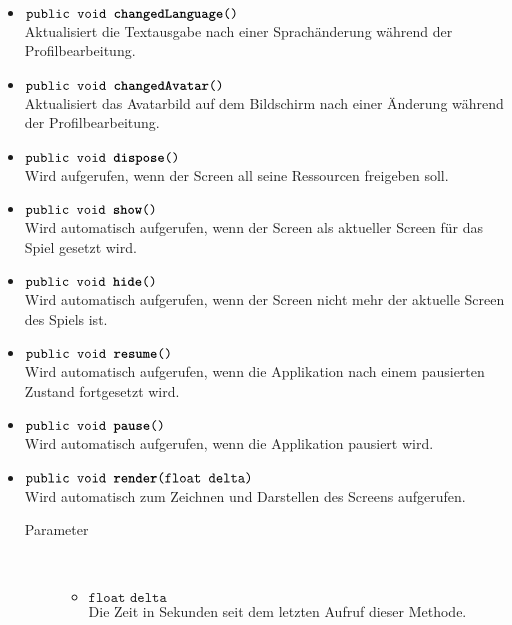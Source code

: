 \begin{description}
\begin{itemize}
		\item $\texttt{public void \textbf{changedLanguage}()}$ \\ Aktualisiert die Textausgabe nach einer Sprachänderung während der Profilbearbeitung.	
		
		\item $\texttt{public void \textbf{changedAvatar}()}$ \\ Aktualisiert das Avatarbild auf dem Bildschirm nach einer Änderung während der Profilbearbeitung.
		
		\item $\texttt{public void \textbf{dispose}()}$ \\ Wird aufgerufen, wenn der Screen all seine Ressourcen freigeben soll.
		
		\item $\texttt{public void \textbf{show}()}$ \\ Wird automatisch aufgerufen, wenn der Screen als aktueller Screen für das Spiel gesetzt wird.
	
		\item $\texttt{public void \textbf{hide}()}$ \\ Wird automatisch aufgerufen, wenn der Screen nicht mehr der aktuelle Screen des Spiels ist.
	
		\item $\texttt{public void \textbf{resume}()}$ \\ Wird automatisch aufgerufen, wenn die Applikation nach einem pausierten Zustand fortgesetzt wird.	
	
		\item $\texttt{public void \textbf{pause}()}$ \\ Wird automatisch aufgerufen, wenn die Applikation pausiert wird.
	
		\item $\texttt{public void \textbf{render}(float delta)}$ \\ Wird automatisch zum Zeichnen und Darstellen des Screens aufgerufen.
		\begin{description}
			\item[Parameter] \hfill \\
			\vspace{-.8cm}
			\begin{itemize}
				\item $\texttt{float delta}$ \\ Die Zeit in Sekunden seit dem letzten Aufruf dieser Methode.
			\end{itemize}
		\end{description}	
	

\end{itemize}
\end{description}
